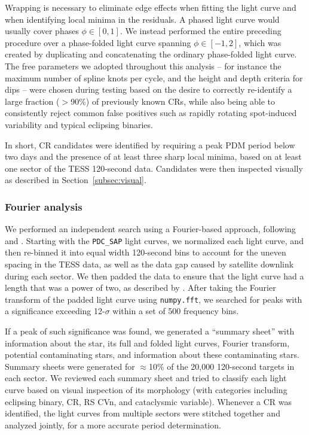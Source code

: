 \documentclass[11pt,twocolumn,tighten]{aastex63}
\begin{document}
Wrapping is necessary to eliminate edge
effects when fitting the light curve and when identifying local minima
in the residuals.  A phased light curve would usually cover phases
$\phi \in [ 0,1 ]$.  We instead performed the entire preceding
procedure over a phase-folded light curve spanning $\phi \in [-1,2 ]$,
which was created by duplicating and concatenating the ordinary
phase-folded light curve.  The free parameters we adopted throughout
this analysis -- for instance the maximum number of spline knots per
cycle, and the height and depth criteria for dips -- were chosen
during testing based on the desire to correctly re-identify a large
fraction ($>$90\%) of previously known CRs, while also being able to
consistently reject common false positives such as rapidly rotating
spot-induced variability and typical eclipsing binaries.

In short, CR candidates were identified by requiring a peak PDM period
below two days and the presence of at least three sharp local minima,
based on at least one sector of the TESS 120-second data. Candidates
were then inspected visually as described in
Section~\ref{subsec:visual}.



\subsubsection{Fourier analysis}
\label{subsec:fourier}

We performed an independent search using a Fourier-based approach,
following \citet{2019ApJ...876..127Z} and \citet[][their
Section~1.3]{2023MNRAS.524.4220P}.  Starting with the {\tt PDC\_SAP}
light curves, we normalized each light curve, and then re-binned it
into equal width 120-second bins to account for the uneven spacing in
the TESS data, as well as the data gap caused by satellite downlink
during each sector.  We then padded the data to ensure that the light
curve had a length that was a power of two, as described by
\citeauthor{2019ApJ...876..127Z}.  After taking the Fourier transform
of the padded light curve using {\tt numpy.fft}, we searched for peaks
with a significance exceeding 12-$\sigma$ within a set of 500
frequency bins.

If a peak of such significance was found, we generated a ``summary
sheet'' with information about the star, its full and folded light
curves, Fourier transform, potential contaminating stars, and
information about these contaminating stars.  Summary sheets were
generated for $\approx$10\% of the 20{,}000 120-second targets in each
sector.  We reviewed each summary sheet and tried to classify each
light curve based on visual inspection of its morphology (with
categories including eclipsing binary, CR, RS CVn, and cataclysmic
variable). Whenever a CR was identified, the light curves from
multiple sectors were stitched together and analyzed jointly, for a
more accurate period determination.
\end{document}
